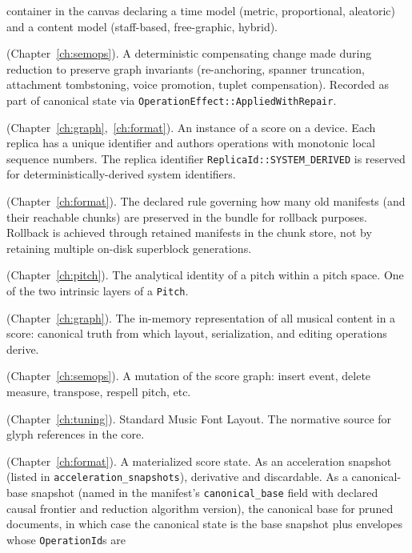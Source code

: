 \documentclass[11pt,letterpaper]{report}
\begin{document}
\begin{description}
    container in the canvas declaring a time model (metric,
    proportional, aleatoric) and a content model (staff-based,
    free-graphic, hybrid).
  \item[Repair record] (Chapter~\ref{ch:semops}). A deterministic
    compensating change made during reduction to preserve graph
    invariants (re-anchoring, spanner truncation, attachment
    tombstoning, voice promotion, tuplet compensation). Recorded
    as part of canonical state via
    \texttt{OperationEffect::AppliedWithRepair}.
  \item[Replica] (Chapter~\ref{ch:graph},~\ref{ch:format}). An
    instance of a score on a device. Each replica has a unique
    identifier and authors operations with monotonic local
    sequence numbers. The replica identifier
    \texttt{ReplicaId::SYSTEM\_DERIVED} is reserved for
    deterministically-derived system identifiers.
  \item[Retention policy] (Chapter~\ref{ch:format}). The
    declared rule governing how many old manifests (and their
    reachable chunks) are preserved in the bundle for rollback
    purposes. Rollback is achieved through retained manifests in
    the chunk store, not by retaining multiple on-disk
    superblock generations.
  \item[Scale position] (Chapter~\ref{ch:pitch}). The analytical
    identity of a pitch within a pitch space. One of the two
    intrinsic layers of a \texttt{Pitch}.
  \item[Score graph] (Chapter~\ref{ch:graph}). The in-memory
    representation of all musical content in a score: canonical
    truth from which layout, serialization, and editing operations
    derive.
  \item[Semantic operation] (Chapter~\ref{ch:semops}). A mutation
    of the score graph: insert event, delete measure, transpose,
    respell pitch, etc.
  \item[SMuFL] (Chapter~\ref{ch:tuning}). Standard Music Font
    Layout. The normative source for glyph references in the core.
  \item[Snapshot] (Chapter~\ref{ch:format}). A materialized score
    state. As an acceleration snapshot (listed in
    \texttt{acceleration\_snapshots}), derivative and discardable.
    As a canonical-base snapshot (named in the manifest's
    \texttt{canonical\_base} field with declared causal frontier
    and reduction algorithm version), the canonical base for
    pruned documents, in which case the canonical state is the
    base snapshot plus envelopes whose \texttt{OperationId}s are

\end{description}
\end{document}
